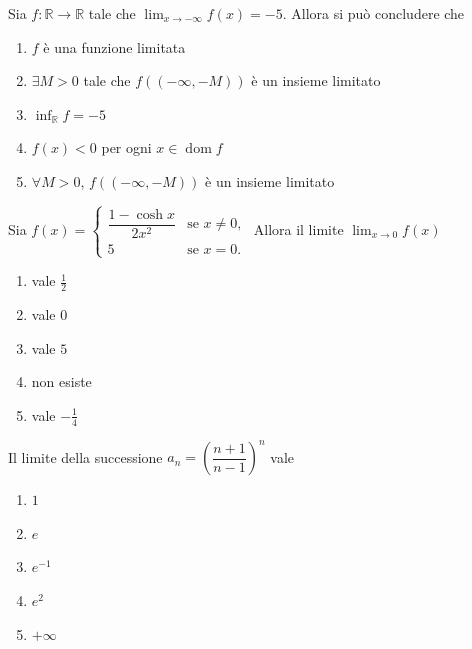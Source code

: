 \begin{quiz}
Sia $f:\mathbb R\to\mathbb R$ tale che $\lim_{x\to-\infty}f(x)=-5$. Allora si pu\`o concludere che
\begin{enumerate}
\item $f$ \`e una funzione limitata
\item $\exists M>0$ tale che $f(( -\infty,-M))$ \`e un insieme limitato
\item $\inf_{\mathbb R}f=-5$
\item $f(x)<0$ per ogni $x\in\operatorname{dom}f$
\item $\forall M>0$, $f((-\infty,-M))$ \`e un insieme limitato
\end{enumerate}
\end{quiz}

\begin{quiz}
Sia $f(x)=\begin{cases}\dfrac{1-\cosh x}{2x^2}&\text{se }x\ne0,\\5&\text{se }x=0.\end{cases}$ Allora il limite $\lim_{x\to0}f(x)$
\begin{enumerate}
\item vale $\frac12$
\item vale $0$
\item vale $5$
\item non esiste
\item vale $-\frac14$
\end{enumerate}
\end{quiz}

\begin{quiz}
Il limite della successione $a_n=\left(\dfrac{n+1}{n-1}\right)^n$ vale
\begin{enumerate}
\item $1$
\item $e$
\item $e^{-1}$
\item $e^2$
\item $+\infty$
\end{enumerate}
\end{quiz}

